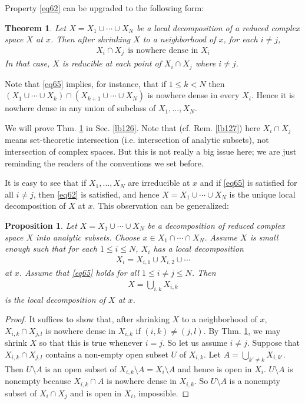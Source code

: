 \documentclass[12pt,b5paper,notitlepage]{report}
\theoremstyle{definition}
\theoremstyle{plain}
\newtheorem{thm}[df]{Theorem}
\newtheorem{pp}[df]{Proposition}
\numberwithin{equation}{section}
\begin{document}
Property \eqref{eq62} can be upgraded to the following form:

\begin{thm}\label{lb125}
Let $X=X_1\cup\cdots\cup X_N$ be a local decomposition of a reduced complex space $X$ at $x$. Then after shrinking $X$ to a neighborhood of $x$, for each $i\neq j$,
\begin{align}
X_i\cap X_j~~\text{is nowhere dense in }X_i\label{eq65}
\end{align}
In that case, $X$ is reducible at each point of $X_i\cap X_j$ where $i\neq j$.
\end{thm}

Note that \eqref{eq65} implies, for instance, that if $1\leq k<N$ then $(X_1\cup\cdots\cup X_k)\cap (X_{k+1}\cup\cdots\cup X_N)$ is nowhere dense in every $X_i$. Hence it is nowhere dense in any union of subclass of $X_1,\dots,X_N$.


We will prove Thm. \ref{lb125} in Sec. \ref{lb126}. Note that (cf. Rem. \ref{lb127}) here $X_i\cap X_j$ means set-theoretic intersection (i.e. intersection of analytic subsets), not intersection of complex spaces. But this is not really a big issue here; we are just reminding the readers of the conventions we set before.


It is easy to see that if $X_1,\dots,X_N$ are irreducible at $x$ and if \eqref{eq65} is satisfied for all $i\neq j$, then \eqref{eq62} is satisfied, and hence $X=X_1\cup\cdots\cup X_N$ is the unique local decomposition of $X$ at $x$. This observation can be generalized:

\begin{pp}\label{lb214}
Let $X=X_1\cup\cdots\cup X_N$ be a decomposition of reduced complex space $X$ into analytic subsets. Choose $x\in X_1\cap\cdots\cap X_N$. Assume $X$ is small enough such that for each $1\leq i\leq N$, $X_i$ has a local decomposition
\begin{align*}
X_i=X_{i,1}\cup X_{i,2}\cup\cdots
\end{align*}
at $x$. Assume that \eqref{eq65} holds for all $1\leq i\neq j\leq N$. Then
\begin{align*}
X=\bigcup_{i,k}X_{i,k}
\end{align*}
is the local decomposition of $X$ at $x$.
\end{pp}

\begin{proof}
It suffices to show that, after shrinking $X$ to a neighborhood of $x$, $X_{i,k}\cap X_{j,l}$ is nowhere dense in $X_{i,k}$ if $(i,k)\neq (j,l)$. By Thm. \ref{lb125}, we may shrink $X$ so that this is true whenever $i=j$. So let us assume $i\neq j$. Suppose that $X_{i,k}\cap X_{j,l}$ contains a non-empty open subset $U$ of $X_{i,k}$.  Let $A=\bigcup_{k'\neq k}X_{i,k'}$. Then $U\setminus A$ is an open subset of $X_{i,k}\setminus A=X_i\setminus A$ and hence is open in $X_i$. $U\setminus A$ is nonempty because $X_{i,k}\cap A$ is nowhere dense in $X_{i,k}$. So $U\setminus A$ is a nonempty subset of $X_i\cap X_j$ and is open in $X_i$, impossible.
\end{proof}
\end{document}
